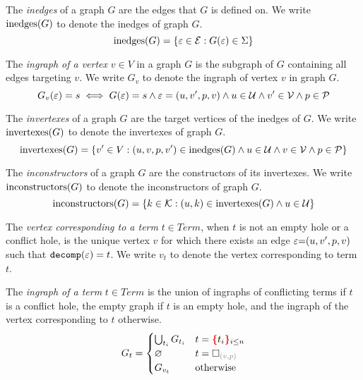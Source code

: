 \begin{definition}
  The \emph{inedges} of a graph $G$ are the edges that $G$ is defined on.
  We write $\text{inedges}\mathopen{}\left(G\right)\mathclose{}$ to denote the inedges of graph $G$.
  \[
    \text{inedges}\mathopen{}\left(G\right)\mathclose{} = \left\{\varepsilon \in \mathcal{E} : G(\varepsilon) \in \Sigma\right\}
  \]
\end{definition}

\begin{definition}
  The \emph{ingraph of a vertex} $v \in V$ in a graph $G$
  is the subgraph of $G$ containing all edges targeting $v$.
  We write $G_v$ to denote the ingraph of vertex $v$ in graph $G$.
  \[
    G_v(\varepsilon) = s \iff G(\varepsilon) = s \land \varepsilon = (u, v', p, v) \land u \in \mathcal{U} \land v' \in \mathcal{V} \land p \in \mathcal{P}
  \]
\end{definition}

\begin{definition}
  The \emph{invertexes} of a graph $G$ are the target vertices of the inedges of $G$.
  We write $\text{invertexes}\mathopen{}\left(G\right)\mathclose{}$ to denote the invertexes of graph $G$.
  \[
    \text{invertexes}\mathopen{}\left(G\right)\mathclose{} = \left\{v' \in V : (u, v, p, v') \in \text{inedges}\mathopen{}\left(G\right)\mathclose{} \land u \in \mathcal{U} \land v \in \mathcal{V} \land p \in \mathcal{P}\right\}
  \]
\end{definition}

\begin{definition}
  The \emph{inconstructors} of a graph $G$ are the constructors of its invertexes.
  We write $\text{inconstructors}\mathopen{}\left(G\right)\mathclose{}$ to denote the inconstructors of graph $G$.
  \[
    \text{inconstructors}\mathopen{}\left(G\right)\mathclose{} = \left\{k \in \mathcal{K} : (u, k) \in \text{invertexes}\mathopen{}\left(G\right)\mathclose{} \land u \in \mathcal{U}\right\}
  \]
\end{definition}

\begin{definition}
  The \emph{vertex corresponding to a term} $t \in Term$,
  when $t$ is not an empty hole or a conflict hole,
  is the unique vertex $v$ for which there exists an edge $\varepsilon{=}(u, v', p, v)$ such that $\operatorname{\texttt{decomp}}\mathopen{}\left(\varepsilon\right)\mathclose{} = t$.
  We write $v_t$ to denote the vertex corresponding to term $t$.
\end{definition}

\begin{definition}
  The \emph{ingraph of a term} $t \in Term$
  is the union of ingraphs of conflicting terms if $t$ is a conflict hole,
  the empty graph if $t$ is an empty hole,
  and the ingraph of the vertex corresponding to $t$ otherwise.
  \[
    G_t =
    \begin{cases}
      \bigcup_{t_i} G_{t_i} & t = \conflictHole[i \leq n]{t_i} \\
      \varnothing & t = \emptyHole{v}{p} \\
      G_{v_t} & \text{otherwise} \\
    \end{cases}
  \]
\end{definition}

